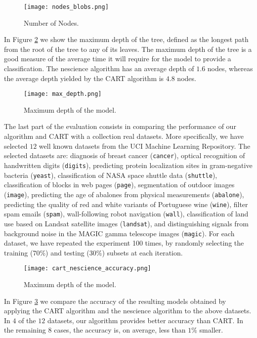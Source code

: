 \begin{figure}[h]
\centering
\texttt{[image: nodes\_blobs.png]}
\caption{Number of Nodes.}
\label{figure:length_nodes}
\end{figure}

In Figure \ref{figure:blob_max_depth} we show the maximum depth of the tree, defined as the longest path from the root of the tree to any of its leaves. The maximum depth of the tree is a good measure of the average time it will require for the model to provide a classification. The nescience algorithm has an average depth of $1.6$ nodes, whereas the average depth yielded by the CART algorithm is $4.8$ nodes.

\begin{figure}[h]
\centering
\texttt{[image: max\_depth.png]}
\caption{Maximum depth of the model.}
\label{figure:blob_max_depth}
\end{figure}

The last part of the evaluation consists in comparing the performance of our algorithm and CART with a collection real datasets. More specifically, we have selected $12$ well known datasets from the UCI Machine Learning Repository. The selected datasets are: diagnosis of breast cancer (\texttt{cancer}), optical recognition of handwritten digits (\texttt{digits}), predicting protein localization sites in gram-negative bacteria (\texttt{yeast}), classification of NASA space shuttle data (\texttt{shuttle}), classification of blocks in web pages (\texttt{page}), segmentation of outdoor images (\texttt{image}), predicting the age of abalones from physical measurements (\texttt{abalone}), predicting the quality of red and white variants of Portuguese wine (\texttt{wine}), filter spam emails (\texttt{spam}), wall-following robot navigation (\texttt{wall}), classification of land use based on Landsat satellite images (\texttt{landsat}), and distinguishing signals from background noise in the MAGIC gamma telescope images (\texttt{magic}). For each dataset, we have repeated the experiment 100 times, by randomly selecting the training (70\%) and testing (30\%) subsets at each iteration.

\begin{figure}[h]
\centering
\texttt{[image: cart\_nescience\_accuracy.png]}
\caption{Maximum depth of the model.}
\label{figure:cart_nescience_accuracy}
\end{figure}

In Figure \ref{figure:cart_nescience_accuracy} we compare the accuracy of the resulting models obtained by applying the CART algorithm and the nescience algorithm to the above datasets. In $4$ of the $12$ datasets, our algorithm provides better accuracy than CART. In the remaining $8$ cases, the accuracy is, on average, less than $1\%$ smaller.

